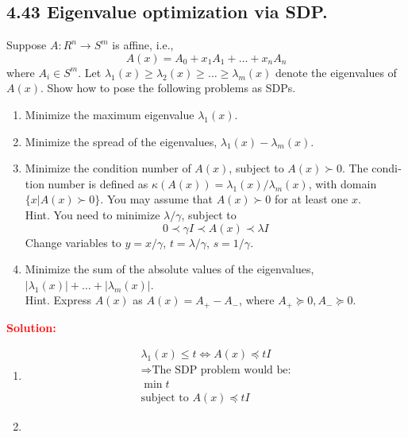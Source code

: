 \begin{latin}

\section{4.43 Eigenvalue optimization via SDP.}
Suppose $ A : R^{n} \to S^{m} $ is affine, i.e.,
\begin{equation*}
	A(x) = A_{0} + x_{1}A_{1} + \dots + x_{n}A_{n}
\end{equation*}
where $ A_{i} \in S^{m}.$  Let $ \lambda_{1}(x) \geq \lambda_2(x) \geq \dots \geq \lambda_m(x) $ denote the eigenvalues of $ A(x) $. Show
how to pose the following problems as SDPs.

\begin{enumerate}
	\item Minimize the maximum eigenvalue $ \lambda_1(x) $.
	\item Minimize the spread of the eigenvalues, $ \lambda_1(x) - \lambda_m(x) $.
	\item Minimize the condition number of $ A(x) $, subject to $ A(x) \succ 0 $. The condition number is defined as $ \kappa(A(x)) = \lambda_1(x)/\lambda_m(x) $, with domain $ \{x | A(x) \succ 0\} $. You may assume that $ A(x) \succ 0 $ for at least one $ x $.
	\\
	Hint. You need to minimize $ \lambda/\gamma $, subject to
	\begin{equation*}
		0 \prec \gamma I \prec A(x) \prec \lambda I
	\end{equation*}
	Change variables to $ y = x/\gamma $, $ t = \lambda/\gamma $, $ s = 1/\gamma $.
	\item Minimize the sum of the absolute values of the eigenvalues, $ |\lambda_1(x)| + \dots + |\lambda_m(x)| $.
	\\
	Hint. Express $ A(x) $ as $ A(x) = A_{+} - A_{-} $, where $ A_{+} \succeq 0, A_{-} \succeq 0 $.
\end{enumerate}
\textcolor{red}{\textbf{Solution:}}
\\
\begin{enumerate}
	\item 
	\begin{gather*}
		\lambda_1(x) \leq t  \Leftrightarrow A(x) \preceq tI
		\\
		\Rightarrow \text{The SDP problem would be:}
		\\
		\min t
		\\
		\text{subject to } A(x) \preceq tI
	\end{gather*}
	\item

\end{enumerate}
\end{latin}
